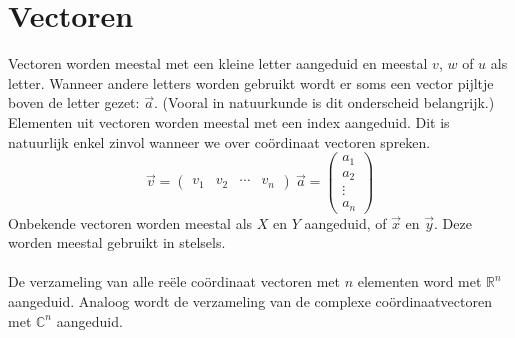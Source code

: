\documentclass[lineaire_algebra_oplossingen.tex]{subfiles}
\begin{document}
\section{Vectoren}
Vectoren worden meestal met een kleine letter aangeduid en meestal $v$, $w$ of $u$ als letter.
Wanneer andere letters worden gebruikt wordt er soms een vector pijltje boven de letter gezet: $\vec{a}$. (Vooral in natuurkunde is dit onderscheid belangrijk.)
Elementen uit vectoren worden meestal met een index aangeduid. Dit is natuurlijk enkel zinvol wanneer we over co\"ordinaat vectoren spreken.
\[
\vec{v} = 
\begin{pmatrix}
v_{1}&v_{2}&\cdots&v_{n}
\end{pmatrix}
\ 
\vec{a} = 
\begin{pmatrix}
a_{1}\\a_{2}\\\vdots\\a_{n}
\end{pmatrix}
\]
Onbekende vectoren worden meestal als $X$ en $Y$ aangeduid, of $\vec{x}$ en $\vec{y}$. Deze worden meestal gebruikt in stelsels.\\\\
De verzameling van alle re\"ele co\"ordinaat vectoren met $n$ elementen word met $\mathbb{R}^n$ aangeduid. Analoog wordt de verzameling van de complexe co\"ordinaatvectoren met $\mathbb{C}^n$ aangeduid.
\end{document}
